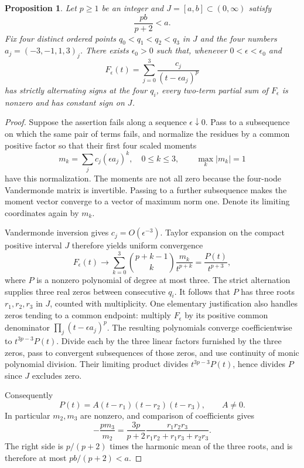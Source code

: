 \documentclass[11pt]{article}
\newtheorem{proposition}{Proposition}
\begin{document}
\begin{proposition}\label{prop:uniform}
Let $p\geq1$ be an integer and $J=[a,b]\subset(0,\infty)$ satisfy
\[
 \frac{pb}{p+2}<a.
 \tag{2}\label{eq:interval}
\]
Fix four distinct ordered points $q_0<q_1<q_2<q_3$ in $J$ and
the four numbers $a_j=(-3,-1,1,3)_j$. There exists $\epsilon_0>0$
such that, whenever $0<\epsilon<\epsilon_0$ and
\[
 F_\epsilon(t)=\sum_{j=0}^3\frac{c_j}{(t-\epsilon a_j)^p}
\]
has strictly alternating signs at the four $q_i$, every two-term
partial sum of $F_\epsilon$ is nonzero and has constant sign on $J$.
\end{proposition}
\begin{proof}
Suppose the assertion fails along a sequence $\epsilon\downarrow0$.
Pass to a subsequence on which the same pair of terms fails, and
normalize the residues by a common positive factor so that their
first four scaled moments
\[
 m_k=\sum_j c_j(\epsilon a_j)^k,\quad 0\leq k\leq3,
 \qquad \max_k|m_k|=1
\]
have this normalization. The moments are not all zero because the
four-node Vandermonde matrix is invertible. Passing to a further
subsequence makes the moment vector converge to a vector of maximum
norm one. Denote its limiting coordinates again by $m_k$.

Vandermonde inversion gives $c_j=O(\epsilon^{-3})$. Taylor expansion
on the compact positive interval $J$ therefore yields uniform
convergence
\[
 F_\epsilon(t)\longrightarrow
 \sum_{k=0}^3\binom{p+k-1}{k}\frac{m_k}{t^{p+k}}
 =\frac{P(t)}{t^{p+3}},
\]
where $P$ is a nonzero polynomial of degree at most three.
The strict alternation supplies three real zeros between consecutive
$q_i$. It follows that $P$ has three roots $r_1,r_2,r_3$ in $J$,
counted with multiplicity. One elementary justification also handles
zeros tending to a common endpoint: multiply $F_\epsilon$ by its
positive common denominator $\prod_j(t-\epsilon a_j)^p$.
The resulting polynomials converge coefficientwise to
$t^{3p-3}P(t)$. Divide each by the three linear factors furnished
by the three zeros, pass to convergent subsequences of those zeros,
and use continuity of monic polynomial division. Their limiting
product divides $t^{3p-3}P(t)$, hence divides $P$ since $J$ excludes
zero.

Consequently
\[
 P(t)=A(t-r_1)(t-r_2)(t-r_3),\qquad A\ne0.
\]
In particular $m_2,m_3$ are nonzero, and comparison of coefficients
gives
\[
 -\frac{p m_3}{m_2}
 =\frac{3p}{p+2}\frac{r_1r_2r_3}
 {r_1r_2+r_1r_3+r_2r_3}.
 \tag{3}\label{eq:root}
\]
The right side is $p/(p+2)$ times the harmonic mean of the three
roots, and is therefore at most $pb/(p+2)<a$.


\end{proof}
\end{document}
